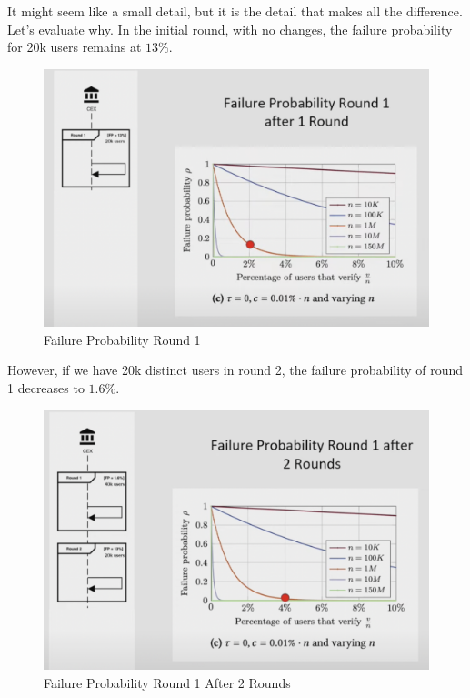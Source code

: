 It might seem like a small detail, but it is the detail that makes all the difference. Let's evaluate why.
In the initial round, with no changes, the failure probability for 20k users remains at $13\%$.

\begin{figure}[H]
   \centering
   \includegraphics[width=130mm]{FailureProbabilityRound1.png}
   \caption{Failure Probability Round 1 \cite{NS23}}
   \label{overflow}
   \end{figure}

However, if we have 20k distinct users in round 2, the failure probability of round 1 decreases to $1.6\%$.

\begin{figure}[H]
   \centering
   \includegraphics[width=130mm]{FailureProbabilityRound2.png}
   \caption{Failure Probability Round 1 After 2 Rounds \cite{NS23}}
   \label{overflow}
   \end{figure}

